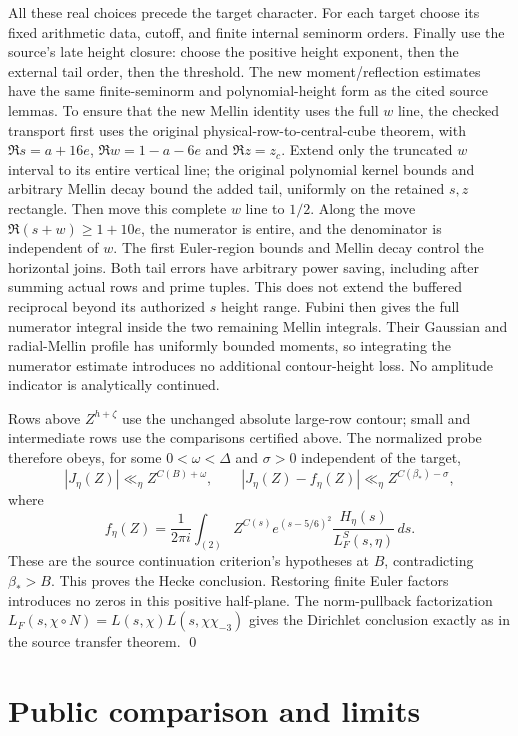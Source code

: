 \documentclass[11pt]{article}
\newcommand{\Bstar}{\beta_*}
\begin{document}
All these real choices precede the target character. For each target
choose its fixed arithmetic data, cutoff, and finite internal seminorm
orders. Finally use the source's late height closure: choose the positive
height exponent, then the external tail order, then the threshold.
The new moment/reflection estimates have the same finite-seminorm and
polynomial-height form as the cited source lemmas. To ensure that the
new Mellin identity uses the full $w$ line, the checked transport first
uses the original physical-row-to-central-cube theorem, with
$\Re s=a+16e$, $\Re w=1-a-6e$ and $\Re z=z_c$.
Extend only the truncated $w$ interval to its entire vertical line;
the original polynomial kernel bounds and arbitrary Mellin decay bound
the added tail, uniformly on the retained $s,z$ rectangle.
Then move this complete $w$ line to $1/2$. Along the move
$\Re(s+w)\ge1+10e$, the numerator is entire, and the denominator is
independent of $w$. The first Euler-region bounds and Mellin decay
control the horizontal joins. Both tail errors have arbitrary power
saving, including after summing actual rows and prime tuples.
This does not extend the buffered reciprocal beyond its authorized
$s$ height range. Fubini then gives the full numerator integral inside
the two remaining Mellin integrals. Their Gaussian and radial-Mellin
profile has uniformly bounded moments, so integrating the numerator
estimate introduces no additional contour-height loss. No amplitude
indicator is analytically continued.

Rows above $Z^{h+\zeta}$ use the unchanged absolute large-row contour;
small and intermediate rows use the comparisons certified above. The
normalized probe therefore obeys, for some $0<\omega<\Delta$ and
$\sigma>0$ independent of the target,
\[
 |J_\eta(Z)|\ll_\eta Z^{C(B)+\omega},\qquad
 |J_\eta(Z)-f_\eta(Z)|\ll_\eta Z^{C(\Bstar)-\sigma},
\]
where
\[
 f_\eta(Z)=\frac1{2\pi i}\int_{(2)}
 Z^{C(s)}e^{(s-5/6)^2}\frac{H_\eta(s)}{L_F^S(s,\eta)}\,ds.
\]
These are the source continuation criterion's hypotheses at $B$,
contradicting $\Bstar>B$. This proves the Hecke conclusion.
Restoring finite Euler factors introduces no zeros in this positive
half-plane. The norm-pullback factorization
$L_F(s,\chi\circ N)=L(s,\chi)L(s,\chi\chi_{-3})$ gives the Dirichlet
conclusion exactly as in the source transfer theorem. \qed

\section{Public comparison and limits}
\end{document}
